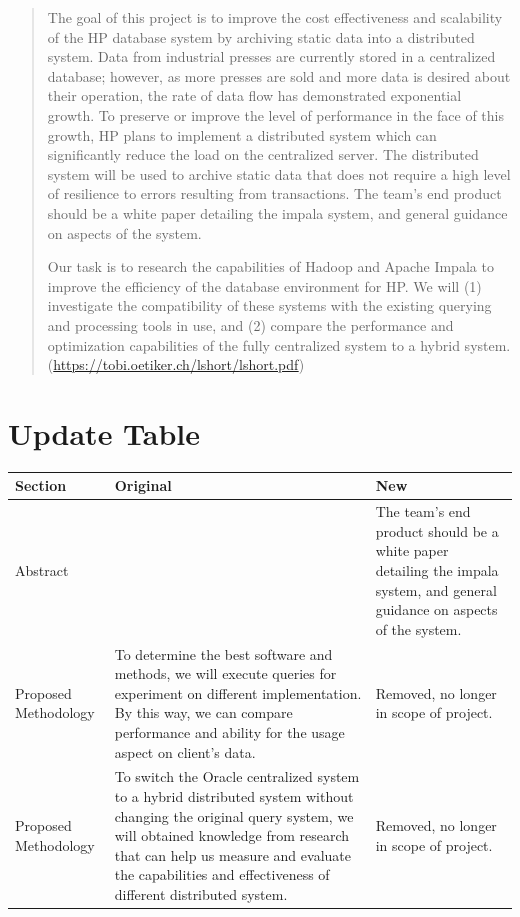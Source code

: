 \documentclass[onecolumn, draftclsnofoot,10pt, compsoc]{IEEEtran}
\begin{document}
\begin{titlepage}
\begin{abstract}
        	The goal of this project is to improve the cost effectiveness and scalability of the HP database system by archiving static data into a distributed system. Data from industrial presses are currently stored in a centralized database; however, as more presses are sold and more data is desired about their operation, the rate of data flow has demonstrated exponential growth. To preserve or improve the level of performance in the face of this growth, HP plans to implement a distributed system which can significantly reduce the load on the centralized server. The distributed system will be used to archive static data that does not require a high level of resilience to errors resulting from transactions. The team's end product should be a white paper detailing the impala system, and general guidance on aspects of the system.

Our task is to research the capabilities of Hadoop and Apache Impala to improve the efficiency of the database environment for HP. We will (1) investigate the compatibility of these systems with the existing querying and processing tools in use, and (2) compare the performance and optimization capabilities of the fully centralized system to a hybrid system.
 (\url{https://tobi.oetiker.ch/lshort/lshort.pdf})
        \end{abstract}     
\end{titlepage}
\newpage
{}
\tableofcontents
\clearpage

\section{Update Table}
\begin{tabular}{|p{5cm}|p{5cm}|p{5cm}|}
\hline
     Section & Original & New \\ \hline
     Abstract &  & The team's end product should be a white paper detailing the impala system, and general guidance on aspects of the system.  \\
     \hline 
     Proposed Methodology & To determine the best software and methods, we will execute queries for experiment on different implementation. By this way, we can compare performance and ability for the usage aspect on client’s data. & Removed, no longer in scope of project.  \\
     \hline 
     Proposed Methodology & To switch the Oracle centralized system to a hybrid distributed system without changing the original query system, we will obtained knowledge from research that can help us measure and evaluate the capabilities and effectiveness of different distributed system.  & Removed, no longer in scope of project. \\
     \hline
\end{tabular}
\end{document}

